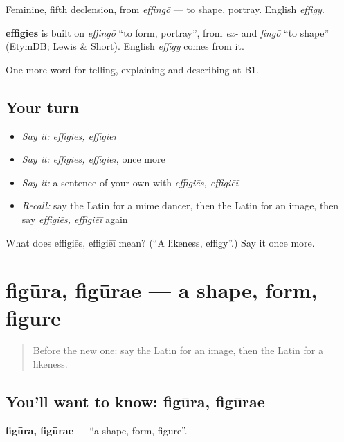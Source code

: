 Feminine, fifth declension, from \emph{effingō} — to shape, portray. English \emph{effigy}.

\begin{cousinweb}
\textbf{effigiēs} is built on \emph{effingō} \textquotedblleft{}to form, portray\textquotedblright{}, from \emph{ex-} and \emph{fingō} \textquotedblleft{}to shape\textquotedblright{} (EtymDB; Lewis \& Short). English \emph{effigy} comes from it.
\end{cousinweb}

\begin{grammarlens}[title={What you've built}]
One more word for telling, explaining and describing at B1.
\end{grammarlens}

\subsection*{Your turn}
\begin{itemize}
\raggedright
  \item \emph{Say it:} \emph{effigiēs, effigiēī}
  \item \emph{Say it:} \emph{effigiēs, effigiēī}, once more
  \item \emph{Say it:} a sentence of your own with \emph{effigiēs, effigiēī}
  \item \emph{Recall:} say the Latin for a mime dancer, then the Latin for an image, then say \emph{effigiēs, effigiēī} again
\end{itemize}

\begin{tcolorbox}[breakable,colback=teal!4,colframe=teal!35!black,title={Before you move on}]
What does effigiēs, effigiēī mean? (\textquotedblleft{}A likeness, effigy\textquotedblright{}.) Say it once more.
\end{tcolorbox}
\section[figūra, figūrae]{figūra, figūrae — a shape, form, figure}

\label{lesson:LA-C547-figura}



\begin{quote}
Before the new one: say the Latin for an image, then the Latin for a likeness.
\end{quote}

\subsection*{You'll want to know: figūra, figūrae}
\textbf{figūra, figūrae} — \textquotedblleft{}a shape, form, figure\textquotedblright{}.

